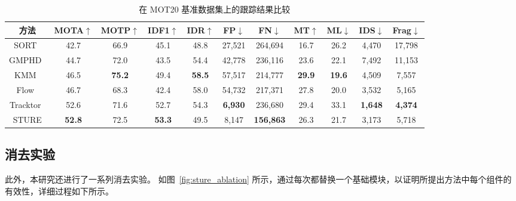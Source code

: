 \vspace{0.5em}
\renewcommand\arraystretch{1.5}
\begin{table}[htbp]\wuhao
	\centering
	\caption{在 MOT20 基准数据集上的跟踪结果比较}
	\vspace{0.3em}
	\begin{tabular}{c|cccccccccc}
		\hline
		方法   & MOTA$ \uparrow $ & MOTP$ \uparrow $  & IDF1$ \uparrow $  & IDR$ \uparrow $ & FP$ \downarrow $  & FN$ \downarrow $  & MT$ \uparrow $  & ML$ \downarrow $  & IDS$ \downarrow $  & Frag$ \downarrow $\\ 
		\hline
		SORT~\citep{bewley2016simple}   &42.7 &66.9 &45.1  &48.8 &27,521 &264,694 &16.7 &26.2 &4,470 & 17,798 \\
		GMPHD~\citep{baisa2021occlusion} &44.7 &72.0 &43.5 &54.4 &42,778 &236,116 &23.6 &22.1 &7,492 &11,153 \\
		KMM~\citep{urbann2021online}  &46.5 &\bfseries75.2 &49.4 &\bfseries58.5 &57,517 &214,777 &\bfseries29.9 &\bfseries19.6 &4,509 &7,557 \\
		Flow~\citep{nishimura2021sdof}    &46.7 &68.3 &42.4 &58.0 &54,732 &217,371 &27.8 &20.0 &3,532 &5,165 \\
		Tracktor~\citep{bergmann2019tracking}    &52.6 &71.6 &{52.7} &54.3 &\bfseries6,930 &236,680 &29.4 &33.1 &\bfseries1,648 &\bfseries4,374 \\
		STURE    &\bfseries52.8 &72.5 &\bfseries53.3 &49.5 &8,147 &\bfseries156,863 &26.3 &21.7 &3,173 &5,718  \\
		\hline
	\end{tabular}
	\label{tab:sture_performance_MOT20}
\end{table}


\subsection{消去实验}
\label{sec:ablationstudy}
此外，本研究还进行了一系列消去实验。 
如图~\ref{fig:sture_ablation} 所示，通过每次都替换一个基础模块，以证明所提出方法中每个组件的有效性，详细过程如下所示。

